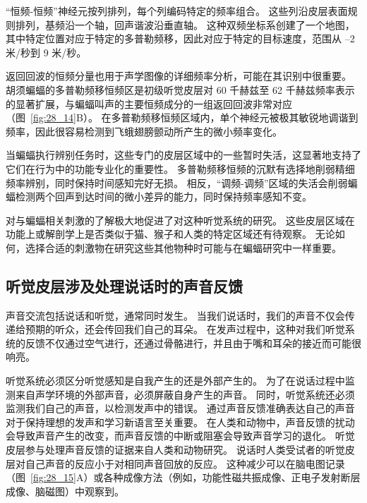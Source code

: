 “恒频-恒频”神经元按列排列，每个列编码特定的频率组合。
这些列沿皮层表面规则排列，基频沿一个轴，回声谐波沿垂直轴。
这种双频坐标系创建了一个地图，其中特定位置对应于特定的多普勒频移，因此对应于特定的目标速度，范围从 –2 米/秒到 9 米/秒。


返回回波的恒频分量也用于声学图像的详细频率分析，可能在其识别中很重要。
胡须蝙蝠的多普勒频移恒频区是初级听觉皮层对 60 千赫兹至 62 千赫兹频率表示的显著扩展，与蝙蝠叫声的主要恒频成分的一组返回回波非常对应（图~\ref{fig:28_14}B）。
在多普勒频移恒频区域内，单个神经元被极其敏锐地调谐到频率，因此很容易检测到飞蛾翅膀颤动所产生的微小频率变化。


当蝙蝠执行辨别任务时，这些专门的皮层区域中的一些暂时失活，这显著地支持了它们在行为中的功能专业化的重要性。
多普勒频移恒频的沉默有选择地削弱精细频率辨别，同时保持时间感知完好无损。
相反，“调频-调频”区域的失活会削弱蝙蝠检测两个回声到达时间的微小差异的能力，同时保持频率感知不变。


对与蝙蝠相关刺激的了解极大地促进了对这种听觉系统的研究。
这些皮层区域在功能上或解剖学上是否类似于猫、猴子和人类的特定区域还有待观察。
无论如何，选择合适的刺激物在研究这些其他物种时可能与在蝙蝠研究中一样重要。



\subsection{听觉皮层涉及处理说话时的声音反馈}

声音交流包括说话和听觉，通常同时发生。
当我们说话时，我们的声音不仅会传递给预期的听众，还会传回我们自己的耳朵。
在发声过程中，这种对我们听觉系统的反馈不仅通过空气进行，还通过骨骼进行，并且由于嘴和耳朵的接近而可能很响亮。


听觉系统必须区分听觉感知是自我产生的还是外部产生的。
为了在说话过程中监测来自声学环境的外部声音，必须屏蔽自身产生的声音。
同时，听觉系统还必须监测我们自己的声音，以检测发声中的错误。
通过声音反馈准确表达自己的声音对于保持理想的发声和学习新语言至关重要。
在人类和动物中，声音反馈的扰动会导致声音产生的改变，而声音反馈的中断或阻塞会导致声音学习的退化。
听觉皮层参与处理声音反馈的证据来自人类和动物研究。
说话时人类受试者的听觉皮层对自己声音的反应小于对相同声音回放的反应。
这种减少可以在脑电图记录（图~\ref{fig:28_15}A）或各种成像方法（例如，功能性磁共振成像、正电子发射断层成像、脑磁图）中观察到。


